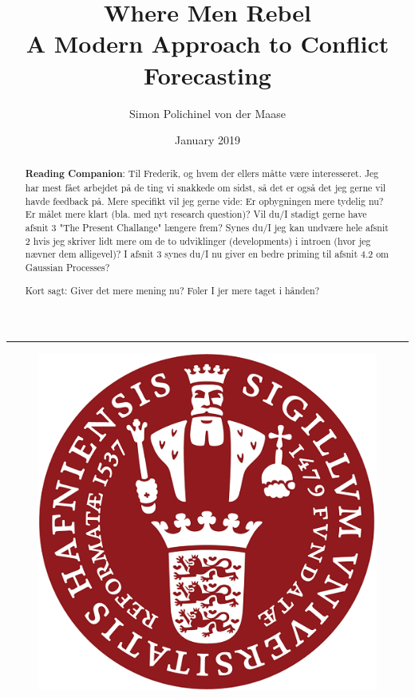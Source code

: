 \documentclass[a4paper]{article}
\title{Where Men Rebel\\A Modern Approach to Conflict Forecasting}
\author{Simon Polichinel von der Maase}
\date{January 2019}
\begin{document}
	\begin{titlepage}
		\maketitle
		\noindent\rule{\linewidth}{0.4pt}
		\begin{figure}[h]
			\centering
			\includegraphics[scale=0.32]{KU_logo.png}
		\end{figure}
		\thispagestyle{empty} %
	\end{titlepage}
    \tableofcontents
\pagebreak

\begin{abstract}
\textbf{Reading Companion}: Til Frederik, og hvem der ellers måtte være interesseret. Jeg har mest fået arbejdet på de ting vi snakkede om sidst, så det er også det jeg gerne vil havde feedback på. Mere specifikt vil jeg gerne vide: Er opbygningen mere tydelig nu? Er målet mere klart (bla. med nyt research question)? Vil du/I stadigt gerne have afsnit 3 "The Present Challange" længere frem? Synes du/I jeg kan undvære hele afsnit 2 hvis jeg skriver lidt mere om de to udviklinger (developments) i introen (hvor jeg nævner dem alligevel)? I afsnit 3 synes du/I nu giver en bedre priming til afsnit 4.2 om Gaussian Processes?\par\par

Kort sagt: Giver det mere mening nu? Føler I jer mere taget i hånden?\par

\end{abstract}
\pagebreak
\end{document}
